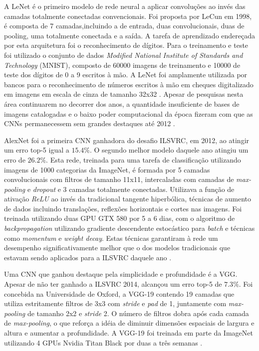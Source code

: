 A LeNet é o primeiro modelo de rede neural a aplicar convoluções ao invés das camadas totalmente conectadas convencionais. Foi proposta por LeCun em 1998, é composta de 7 camadas,incluindo a de entrada, duas convolucionais, duas de pooling, uma totalmente conectada e a saída. A tarefa de aprendizado endereçada por esta arquitetura foi o reconhecimento de dígitos. Para o treinamento e teste foi utilizado o conjunto de dados \emph{Modified National Institute of Standards and Technology} (MNIST), composto de 60000 imagens de treinamento e 10000 de teste dos dígitos de 0 a 9 escritos à mão. A LeNet foi amplamente utilizada por bancos para o reconhecimento de números escritos à mão em cheques digitalizado em imagens em escala de cinza de tamanho 32x32 \cite{lenet}. Apesar de pesquisas nesta área continuarem no decorrer dos anos, a quantidade insuficiente de bases de imagens catalogadas e o baixo poder computacional da época fizeram com que as CNNs permanecessem sem grandes destaques até 2012 \cite{dl9papers}.

AlexNet foi a primeira CNN ganhadora do desafio ILSVRC, em 2012, ao atingir um erro top-5 igual a $15.4\%$. O segundo melhor modelo daquele ano atingiu um erro de $26.2\%$. Esta rede, treinada para uma tarefa de classificação utilizando imagens de 1000 categorias da ImageNet, é formada por 5 camadas convolucionais com filtros de tamanho 11x11, intercaladas com camadas de \emph{max-pooling} e \emph{dropout} e 3 camadas totalmente conectadas. Utilizava a função de ativação \emph{ReLU} ao invés da tradicional tangente hiperbólica, técnicas de aumento de dados incluindo translações, reflexões horizontais e cortes nas imagens. Foi treinada utilizando duas GPU GTX 580 por 5 a 6 dias, com o algoritmo de \emph{backpropagation} utilizando gradiente descendente estocástico para \emph{batch} e técnicas como \emph{momentum} e \emph{weight decay}. Estas técnicas garantiram à rede um desempenho significativamente melhor que o dos modelos tradicionais que estavam sendo aplicados para a ILSVRC daquele ano \cite{alexnet}.

Uma CNN que ganhou destaque pela simplicidade e profundidade é a VGG. Apesar de não ter ganhado a ILSVRC 2014, alcançou um erro top-5 de $7.3\%$. Foi concebida na Universidade de Oxford, a VGG-19 contendo 19 camadas que utiliza estritamente filtros de 3x3 com \emph{stride} e \emph{pad} de 1, juntamente com \emph{max-pooling} de tamanho 2x2 e \emph{stride} 2. O número de filtros dobra após cada camada de \emph{max-pooling}, o que reforça a idéia de diminuir dimensões espaciais de largura e altura e aumentar a profundidade. A VGG-19 foi treinada em parte da ImageNet utilizando 4 GPUs Nvidia Titan Black por duas a três semanas \cite{vggnet}.

